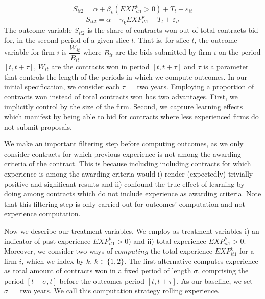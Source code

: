 \begin{equation}
  \label{eqn:olsspec1}
S_{it2}=\alpha+ \beta_{k} (EXP^k_{it1}>0)+T_t+\varepsilon_{it}
\end{equation}
\begin{equation}
\label{eqn:olsspec2}
S_{it2}=\alpha+ \gamma_{k} EXP^k_{it1}+T_t+\varepsilon_{it}
\end{equation}
The outcome variable $S_{it2}$ is the share of contracts won out of total contracts bid for, in the second period of a given slice $t$. That is, for slice $t$, the outcome variable for firm $i$ is $\dfrac{W_{it}}{B_{it}}$ where $B_{it}$ are the bids submitted by firm $i$ on the period $[t,t+\tau]$, $W_{it}$ are the contracts won in period $[t,t+\tau]$ and $\tau$ is a parameter that controls the length of the periods in which we compute outcomes. In our initial specification, we consider each $\tau=$ two years. Employing a proportion of contracts won instead of total contracts won has two advantages. First, we implicitly control by the size of the firm. Second, we capture learning effects which manifest by being able to bid for contracts where less experienced firms do not submit proposals.

We make an important filtering step before computing outcomes, as we only consider contracts for which previous experience is not among the awarding criteria of the contract. This is because including including contracts for which experience is among the awarding criteria would i) render (expectedly) trivially positive and significant results and ii) confound the true effect of learning by doing among contracts which do not include experience as awarding criteria. Note that this filtering step is only carried out for outcomes' computation and not experience computation.


Now we describe our treatment variables. We employ as treatment variables  i) an indicator of past experience $EXP^k_{it1}>0)$ and ii) total experience $EXP^k_{it1}>0$. Moreover, we consider two ways of $computing$ the total experience $EXP^k_{it1}$ for a firm $i$, which we index by $k$, $k\in \{1,2\}$. The first alternative computes experience as total amount of contracts won in a fixed period of length $\sigma$, comprising the period $[t-\sigma,t]$ before the outcomes period $[t,t+\tau]$. As our baseline, we set $\sigma=$ two years. We call this computation strategy rolling experience.

